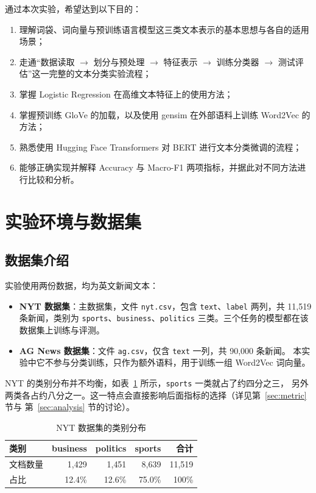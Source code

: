 \documentclass[a4paper]{article}
\begin{document}
通过本次实验，希望达到以下目的：
\begin{enumerate}[(1)]
  \item 理解词袋、词向量与预训练语言模型这三类文本表示的基本思想与各自的适用场景；
  \item 走通“数据读取 $\rightarrow$ 划分与预处理 $\rightarrow$ 特征表示 $\rightarrow$ 训练分类器
        $\rightarrow$ 测试评估”这一完整的文本分类实验流程；
  \item 掌握 Logistic Regression 在高维文本特征上的使用方法；
  \item 掌握预训练 GloVe 的加载，以及使用 gensim 在外部语料上训练 Word2Vec 的方法；
  \item 熟悉使用 Hugging Face Transformers 对 BERT 进行文本分类微调的流程；
  \item 能够正确实现并解释 Accuracy 与 Macro-F1 两项指标，并据此对不同方法进行比较和分析。
\end{enumerate}

\section{实验环境与数据集}
\label{sec:data}

\subsection{数据集介绍}
\label{sec:dataset}

实验使用两份数据，均为英文新闻文本：
\begin{itemize}
  \item \textbf{NYT 数据集}：主数据集，文件 \texttt{nyt.csv}，包含 \texttt{text}、\texttt{label}
        两列，共 11{,}519 条新闻，类别为 \texttt{sports}、\texttt{business}、\texttt{politics}
        三类。三个任务的模型都在该数据集上训练与评测。
  \item \textbf{AG News 数据集}：文件 \texttt{ag.csv}，仅含 \texttt{text} 一列，共 90{,}000 条新闻。
        本实验中它不参与分类训练，只作为额外语料，用于训练一组 Word2Vec 词向量。
\end{itemize}

NYT 的类别分布并不均衡，如表~\ref{tab:data} 所示，\texttt{sports} 一类就占了约四分之三，
另外两类各占约八分之一。这一特点会直接影响后面指标的选择（详见第~\ref{sec:metric} 节与
第~\ref{sec:analysis} 节的讨论）。

\begin{table}[H]
  \centering
  \caption{NYT 数据集的类别分布}
  \label{tab:data}
  \begin{tabular}{l r r r r}
    \toprule
    类别 & business & politics & sports & 合计 \\
    \midrule
    文档数量 & 1{,}429 & 1{,}451 & 8{,}639 & 11{,}519 \\
    占比     & 12.4\%  & 12.6\%  & 75.0\%  & 100\% \\
    \bottomrule
  \end{tabular}
\end{table}
\end{document}
